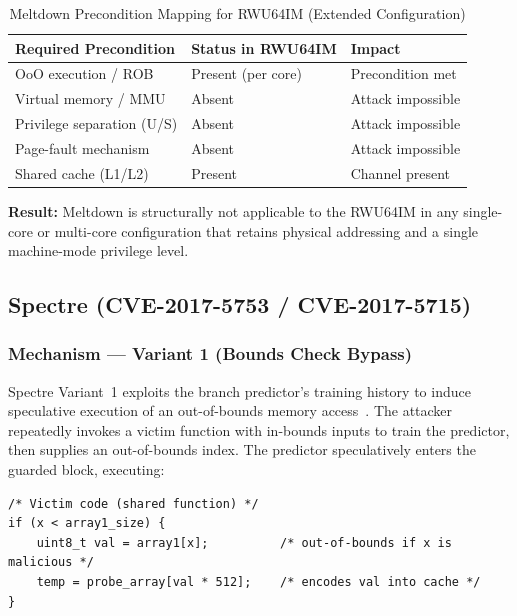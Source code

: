 \begin{table}[h]
\centering
\caption{Meltdown Precondition Mapping for RWU64IM (Extended Configuration)}
\label{tab:meltdown_precond}
\begin{tabular}{lll}
\hline
\textbf{Required Precondition} & \textbf{Status in RWU64IM} & \textbf{Impact} \\
\hline
OoO execution / ROB           & Present (per core)        & Precondition met \\
Virtual memory / MMU          & Absent                    & Attack impossible \\
Privilege separation (U/S)    & Absent                    & Attack impossible \\
Page-fault mechanism          & Absent                    & Attack impossible \\
Shared cache (L1/L2)          & Present                   & Channel present \\
\hline
\end{tabular}
\end{table}

\textbf{Result:} Meltdown is structurally not applicable to the RWU64IM in any
single-core or multi-core configuration that retains physical addressing and a single
machine-mode privilege level.

\subsection{Spectre (CVE-2017-5753 / CVE-2017-5715)}
\label{subsec:spectre}

\subsubsection{Mechanism — Variant 1 (Bounds Check Bypass)}

Spectre Variant~1 exploits the branch predictor's training history to induce
speculative execution of an out-of-bounds memory access~\cite{kocher2019spectre}.
The attacker repeatedly invokes a victim function with in-bounds inputs to train
the predictor, then supplies an out-of-bounds index.  The predictor speculatively
enters the guarded block, executing:

\begin{verbatim}
/* Victim code (shared function) */
if (x < array1_size) {
    uint8_t val = array1[x];          /* out-of-bounds if x is malicious */
    temp = probe_array[val * 512];    /* encodes val into cache */
}
\end{verbatim}

